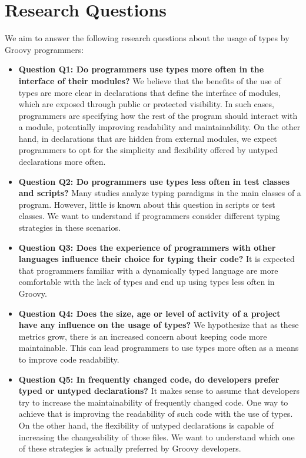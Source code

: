 \documentclass[msc]{ppgccufmg}
\begin{document}
\section{Research Questions\label{questions}}
We aim to answer the following research questions about the usage of types by Groovy programmers:

\begin{itemize}
	\item \textbf{Question Q1: Do programmers use types more often in the interface of their modules?} We believe that the benefits of the use of types are more clear in declarations that define the interface of modules, which are exposed through public or protected visibility. In such cases, programmers are specifying how the rest of the program should interact with a module, potentially improving readability and maintainability. On the other hand, in declarations that are hidden from external modules, we expect programmers to opt for the simplicity and flexibility offered by untyped declarations more often. 
	
	\item \textbf{Question Q2: Do programmers use types less often in test classes and scripts?} Many studies analyze typing paradigms in the main classes of a program. However, little is known about this question in scripts or test classes. We want to understand if programmers consider different typing strategies in these scenarios.

	\item \textbf{Question Q3: Does the experience of programmers with other languages influence their choice for typing their code?} It is expected that programmers familiar with a dynamically typed language are more comfortable with the lack of types and end up using types less often in Groovy. 

	\item \textbf{Question Q4: Does the size, age or level of activity of a project have any influence on the usage of types?} We hypothesize that as these metrics grow, there is an increased concern about keeping code more maintainable. This can lead programmers to use types more often as a means to improve code readability.

	\item \textbf{Question Q5: In frequently changed code, do developers prefer typed or untyped declarations?} It makes sense to assume that developers try to increase the maintainability of frequently changed code. One way to achieve that is improving the readability of such code with the use of types. On the other hand, the flexibility of untyped declarations is capable of increasing the changeability of those files. We want to understand which one of these strategies is actually preferred by Groovy developers.

\end{itemize}
\end{document}
